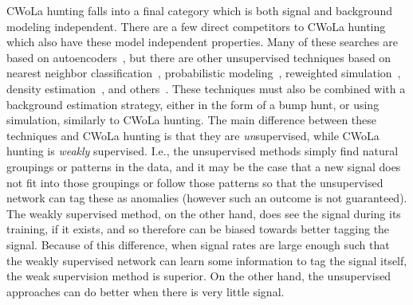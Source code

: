 CWoLa hunting falls into a final category which is both signal and background modeling independent.
There are a few direct competitors to CWoLa hunting which also have these model independent properties.
Many of these searches are based on autoencoders~\cite{Farina:2018fyg,Heimel:2018mkt,Roy:2019jae,Cerri:2018anq,Blance:2019ibf,Hajer:2018kqm}, but there are other unsupervised techniques based on nearest neighbor classification~\cite{1809.02977,DeSimone:2018efk,Mullin:2019mmh}, probabilistic modeling~\cite{Dillon:2019cqt}, reweighted simulation~\cite{Andreassen:2020nkr}, density estimation~\cite{Nachman:2020lpy}, and others~\cite{Aguilar-Saavedra:2017rzt}.
These techniques must also be combined with a background estimation strategy, either in the form of a bump hunt, or using simulation, similarly to CWoLa hunting.
The main difference between these techniques and CWoLa hunting is that they are \textit{un}supervised, while CWoLa hunting is \textit{weakly} supervised.
I.e., the unsupervised methods simply find natural groupings or patterns in the data, and it may be the case that a new signal does not fit into those groupings or follow those patterns so that the unsupervised network can tag these as anomalies (however such an outcome is not guaranteed).
The weakly supervised method, on the other hand, does see the signal during its training, if it exists, and so therefore can be biased towards better tagging the signal.
Because of this difference, when signal rates are large enough such that the weakly supervised network can learn some information to tag the signal itself, the weak supervision method is superior.
On the other hand, the unsupervised approaches can do better when there is very little signal.

